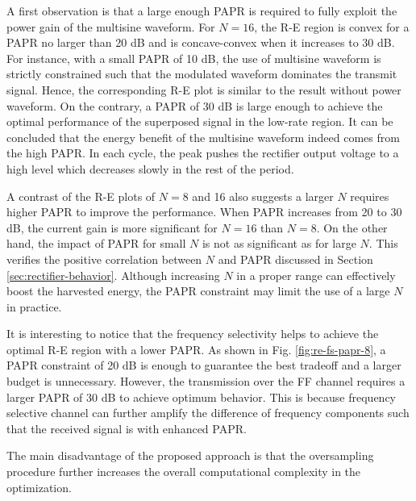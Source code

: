 A first observation is that a large enough PAPR is required to fully exploit the power gain of the multisine waveform. For $N = 16$, the R-E region is convex for a PAPR no larger than 20 dB and is concave-convex when it increases to 30 dB. For instance, with a small PAPR of 10 dB, the use of multisine waveform is strictly constrained such that the modulated waveform dominates the transmit signal. Hence, the corresponding R-E plot is similar to the result without power waveform. On the contrary, a PAPR of 30 dB is large enough to achieve the optimal performance of the superposed signal in the low-rate region. It can be concluded that the energy benefit of the multisine waveform indeed comes from the high PAPR. In each cycle, the peak pushes the rectifier output voltage to a high level which decreases slowly in the rest of the period.

A contrast of the R-E plots of $N = 8$ and 16 also suggests a larger $N$ requires higher PAPR to improve the performance. When PAPR increases from 20 to 30 dB, the current gain is more significant for $N = 16$ than $N = 8$. On the other hand, the impact of PAPR for small $N$ is not as significant as for large $N$. This verifies the positive correlation between $N$ and PAPR discussed in Section \ref{sec:rectifier-behavior}. Although increasing $N$ in a proper range can effectively boost the harvested energy, the PAPR constraint may limit the use of a large $N$ in practice.

It is interesting to notice that the frequency selectivity helps to achieve the optimal R-E region with a lower PAPR. As shown in Fig. \ref{fig:re-fs-papr-8}, a PAPR constraint of 20 dB is enough to guarantee the best tradeoff and a larger budget is unnecessary. However, the transmission over the FF channel requires a larger PAPR of 30 dB to achieve optimum behavior. This is because frequency selective channel can further amplify the difference of frequency components such that the received signal is with enhanced PAPR. 

The main disadvantage of the proposed approach is that the oversampling procedure further increases the overall computational complexity in the optimization. 